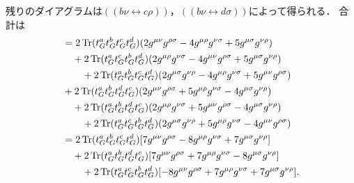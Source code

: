 残りのダイアグラムは$(\!(b\nu\leftrightarrow c\rho)\!)$，$(\!(b\nu\leftrightarrow d\sigma)\!)$によって得られる．
合計は
\begin{align*}
  &= 2 \operatorname{Tr}(t_G^a t_G^b t_G^c t_G^d) (2g^{\mu\nu} g^{\rho\sigma} - 4g^{\mu\rho} g^{\nu\sigma} + 5g^{\mu\sigma} g^{\nu\rho}) \\
  &\quad + 2 \operatorname{Tr}(t_G^a t_G^c t_G^b t_G^d) (2g^{\mu\rho} g^{\nu\sigma} - 4g^{\mu\nu} g^{\rho\sigma} + 5g^{\mu\sigma} g^{\nu\rho}) \\
  &\qquad + 2 \operatorname{Tr}(t_G^a t_G^b t_G^c t_G^d) (2g^{\mu\sigma} g^{\nu\rho} - 4g^{\mu\rho} g^{\nu\sigma} + 5g^{\mu\nu} g^{\rho\sigma}) \\
  & + 2 \operatorname{Tr}(t_G^a t_G^b t_G^d t_G^c) (2g^{\mu\nu} g^{\rho\sigma} + 5g^{\mu\rho} g^{\nu\sigma} - 4g^{\mu\sigma} g^{\nu\rho}) \\
  &\quad + 2 \operatorname{Tr}(t_G^a t_G^b t_G^d t_G^c) (2g^{\mu\rho} g^{\nu\sigma} + 5g^{\mu\nu} g^{\rho\sigma} - 4g^{\mu\sigma} g^{\nu\rho}) \\
  &\qquad + 2 \operatorname{Tr}(t_G^a t_G^c t_G^b t_G^d) (2g^{\mu\sigma} g^{\nu\rho} + 5g^{\mu\rho} g^{\nu\sigma} - 4g^{\mu\nu} g^{\rho\sigma}) \\
  &= 2\operatorname{Tr}(t_G^a t_G^b t_G^c t_G^d) [7g^{\mu\nu} g^{\rho\sigma} - 8g^{\mu\rho} g^{\nu\sigma} + 7g^{\mu\sigma} g^{\nu\rho}] \\
  &\quad + 2\operatorname{Tr}(t_G^a t_G^b t_G^d t_G^c) [7g^{\mu\nu} g^{\rho\sigma} + 7g^{\mu\rho} g^{\nu\sigma} - 8g^{\mu\sigma} g^{\nu\rho}] \\
  &\qquad + 2\operatorname{Tr}(t_G^a t_G^c t_G^b t_G^d) [-8g^{\mu\nu} g^{\rho\sigma} + 7g^{\mu\rho} g^{\nu\sigma} + 7g^{\mu\sigma} g^{\nu\rho}] .
\end{align*}

